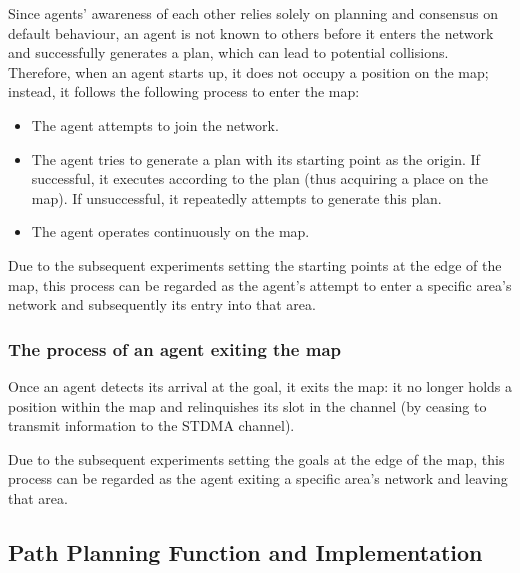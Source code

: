 Since agents' awareness of each other relies solely on planning and consensus on default behaviour, an agent is not known to others before it enters the network and successfully generates a plan, which can lead to potential collisions. Therefore, when an agent starts up, it does not occupy a position on the map; instead, it follows the following process to enter the map:

\begin{itemize}
    \item The agent attempts to join the network.
    \item The agent tries to generate a plan with its starting point as the origin. If successful, it executes according to the plan (thus acquiring a place on the map). If unsuccessful, it repeatedly attempts to generate this plan.
    \item The agent operates continuously on the map.
\end{itemize}

Due to the subsequent experiments setting the starting points at the edge of the map, this process can be regarded as the agent's attempt to enter a specific area's network and subsequently its entry into that area.

\subsubsection{The process of an agent exiting the map}
\label{chap:exit map}

Once an agent detects its arrival at the goal, it exits the map: it no longer holds a position within the map and relinquishes its slot in the channel (by ceasing to transmit information to the STDMA channel).

Due to the subsequent experiments setting the goals at the edge of the map, this process can be regarded as the agent exiting a specific area's network and leaving that area.


\subsection{Path Planning Function and Implementation}


